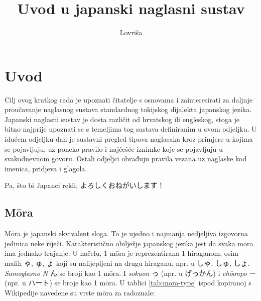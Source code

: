 \documentclass[12pt]{extarticle}
\title{Uvod u japanski naglasni sustav}
\author{Lovriša}
\begin{document}
	\onehalfspacing
	\begin{titlepage}
%		
%		
%		
		\maketitle
	\end{titlepage}
	\cleardoublepage
	\thispagestyle{empty}
	\tableofcontents
	\cleardoublepage
	
	
	\section{Uvod}
	Cilj ovog kratkog rada je upoznati čitatelje s osnovama i zainteresirati za daljnje proučavanje naglasnog sustava standardnog tokijskog dijalekta japanskog jezika.
	Japanski naglasni sustav je dosta različit od hrvatskog ili engleskog, stoga je bitno najprije upoznati se s temeljima tog sustava definiranim u ovom odjeljku.
	U idućem odjeljku dan je sustavni pregled tipova naglasaka kroz primjere u kojima se pojavljuju, uz poneko pravilo i najčešće iznimke koje se pojavljuju u svakodnevnom govoru.
	Ostali odjeljci obrađuju pravila vezana uz naglaske kod imenica, pridjeva i glagola.
	
	Pa, što bi Japanci rekli, よろしくおねがいします！
	
	\subsection{M\=ora}
	M\=ora je japanski ekvivalent sloga.
	To je ujedno i najmanja nedjeljiva izgovorna jedinica neke riječi.
	Karakteristično obilježje japanskog jezika jest da svaka m\=ora ima jednako trajanje.
	U načelu, 1 m\=ora je reprezentirana 1 hiraganom, osim malih ゃ, ゅ, ょ koji su nalijepljeni na drugu hiraganu, npr. u しゃ, しゅ, しょ.
	\textit{Samoglasno N} ん se broji kao 1 m\=ora.
	I \textit{sokuon} っ (npr. u げっかん) i \textit{ch\=oonpo} ー  (npr. u ハート) se broje kao 1 m\=ora.
	U tablici \ref{tab:mora-type} ispod kopiranoj s Wikipedije navedene su vrste m\=ora za radoznale:
	
\end{document}
